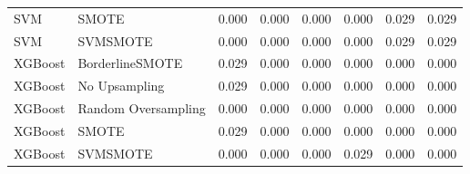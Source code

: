 \begin{tabular}{llllllll}
                         SVM &               SMOTE & 0.000 &                     0.000 &                 0.000 &                  0.000 &                                   0.029 &     0.029 \\
                         SVM &            SVMSMOTE & 0.000 &                     0.000 &                 0.000 &                  0.000 &                                   0.029 &     0.029 \\
                     XGBoost &     BorderlineSMOTE & 0.029 &                     0.000 &                 0.000 &                  0.000 &                                   0.000 &     0.000 \\
                     XGBoost &       No Upsampling & 0.029 &                     0.000 &                 0.000 &                  0.000 &                                   0.000 &     0.000 \\
                     XGBoost & Random Oversampling & 0.000 &                     0.000 &                 0.000 &                  0.000 &                                   0.000 &     0.000 \\
                     XGBoost &               SMOTE & 0.029 &                     0.000 &                 0.000 &                  0.000 &                                   0.000 &     0.000 \\
                     XGBoost &            SVMSMOTE & 0.000 &                     0.000 &                 0.000 &                  0.029 &                                   0.000 &     0.000 \\
\bottomrule
\end{tabular}
